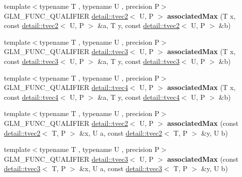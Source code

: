 \begin{DoxyCompactItemize}
\item 
{\footnotesize template$<$typename T , typename U , precision P$>$ }\\G\+L\+M\+\_\+\+F\+U\+N\+C\+\_\+\+Q\+U\+A\+L\+I\+F\+I\+ER \hyperlink{structglm_1_1detail_1_1tvec2}{detail\+::tvec2}$<$ U, P $>$ {\bfseries associated\+Max} (T x, const \hyperlink{structglm_1_1detail_1_1tvec2}{detail\+::tvec2}$<$ U, P $>$ \&a, T y, const \hyperlink{structglm_1_1detail_1_1tvec2}{detail\+::tvec2}$<$ U, P $>$ \&b)\hypertarget{namespaceglm_ac87c6da2e1f2cb4e841aa62635dc0166}{}\label{namespaceglm_ac87c6da2e1f2cb4e841aa62635dc0166}

\item 
{\footnotesize template$<$typename T , typename U , precision P$>$ }\\G\+L\+M\+\_\+\+F\+U\+N\+C\+\_\+\+Q\+U\+A\+L\+I\+F\+I\+ER \hyperlink{structglm_1_1detail_1_1tvec3}{detail\+::tvec3}$<$ U, P $>$ {\bfseries associated\+Max} (T x, const \hyperlink{structglm_1_1detail_1_1tvec3}{detail\+::tvec3}$<$ U, P $>$ \&a, T y, const \hyperlink{structglm_1_1detail_1_1tvec3}{detail\+::tvec3}$<$ U, P $>$ \&b)\hypertarget{namespaceglm_ad605ba2f1c07e4c422cdeb3aacfcaf2e}{}\label{namespaceglm_ad605ba2f1c07e4c422cdeb3aacfcaf2e}

\item 
{\footnotesize template$<$typename T , typename U , precision P$>$ }\\G\+L\+M\+\_\+\+F\+U\+N\+C\+\_\+\+Q\+U\+A\+L\+I\+F\+I\+ER \hyperlink{structglm_1_1detail_1_1tvec4}{detail\+::tvec4}$<$ U, P $>$ {\bfseries associated\+Max} (T x, const \hyperlink{structglm_1_1detail_1_1tvec4}{detail\+::tvec4}$<$ U, P $>$ \&a, T y, const \hyperlink{structglm_1_1detail_1_1tvec4}{detail\+::tvec4}$<$ U, P $>$ \&b)\hypertarget{namespaceglm_ac57a94defad50b236a7a06b1a4989c20}{}\label{namespaceglm_ac57a94defad50b236a7a06b1a4989c20}

\item 
{\footnotesize template$<$typename T , typename U , precision P$>$ }\\G\+L\+M\+\_\+\+F\+U\+N\+C\+\_\+\+Q\+U\+A\+L\+I\+F\+I\+ER \hyperlink{structglm_1_1detail_1_1tvec2}{detail\+::tvec2}$<$ U, P $>$ {\bfseries associated\+Max} (const \hyperlink{structglm_1_1detail_1_1tvec2}{detail\+::tvec2}$<$ T, P $>$ \&x, U a, const \hyperlink{structglm_1_1detail_1_1tvec2}{detail\+::tvec2}$<$ T, P $>$ \&y, U b)\hypertarget{namespaceglm_a77b3777ffa8444c84c785eb0b788a6b1}{}\label{namespaceglm_a77b3777ffa8444c84c785eb0b788a6b1}

\item 
{\footnotesize template$<$typename T , typename U , precision P$>$ }\\G\+L\+M\+\_\+\+F\+U\+N\+C\+\_\+\+Q\+U\+A\+L\+I\+F\+I\+ER \hyperlink{structglm_1_1detail_1_1tvec3}{detail\+::tvec3}$<$ U, P $>$ {\bfseries associated\+Max} (const \hyperlink{structglm_1_1detail_1_1tvec3}{detail\+::tvec3}$<$ T, P $>$ \&x, U a, const \hyperlink{structglm_1_1detail_1_1tvec3}{detail\+::tvec3}$<$ T, P $>$ \&y, U b)\hypertarget{namespaceglm_a40f7f83f46b9e3af8159d06639cc9f9f}{}\label{namespaceglm_a40f7f83f46b9e3af8159d06639cc9f9f}


\end{DoxyCompactItemize}
